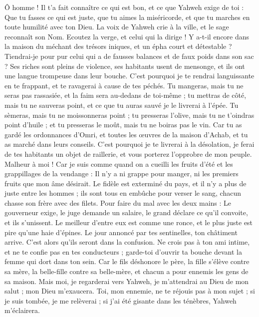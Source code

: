 \begin{multicols}{2}
Ô homme ! Il t'a fait connaître ce qui est bon, et ce que Yahweh exige de toi : Que tu fasses ce qui est juste, que tu aimes la miséricorde, et que tu marches en toute humilité avec ton Dieu.
La voix de Yahweh crie à la ville, et le sage reconnaît son Nom. Ecoutez la verge, et celui qui la dirige !
Y a-t-il encore dans la maison du méchant des trésors iniques, et un épha court et détestable ?
Tiendrai-je pour pur celui qui a de fausses balances et de faux poids dans son sac ?
Ses riches sont pleins de violence, ses habitants usent de mensonge, et ils ont une langue trompeuse dans leur bouche.
C'est pourquoi je te rendrai languissante en te frappant, et te ravagerai à cause de tes péchés.
Tu mangeras, mais tu ne seras pas rassasiée, et la faim sera au-dedans de toi-même ; tu mettras de côté, mais tu ne sauveras point, et ce que tu auras sauvé je le livrerai à l'épée.
Tu sèmeras, mais tu ne moissonneras point ; tu presseras l'olive, mais tu ne t'oindras point d'huile ; et tu presseras le moût, mais tu ne boiras pas le vin.
Car tu as gardé les ordonnances d'Omri, et toutes les œuvres de la maison d'Achab, et tu as marché dans leurs conseils. C'est pourquoi je te livrerai à la désolation, je ferai de tes habitants un objet de raillerie, et vous porterez l'opprobre de mon peuple.
\VerseOne{}Malheur à moi ! Car je suis comme quand on a cueilli les fruits d'été et les grappillages de la vendange : Il n'y a ni grappe pour manger, ni les premiers fruits que mon âme désirait.
Le fidèle est exterminé du pays, et il n'y a plus de juste entre les hommes ; ils sont tous en embûche pour verser le sang, chacun chasse son frère avec des filets.
Pour faire du mal avec les deux mains : Le gouverneur exige, le juge demande un salaire, le grand déclare ce qu'il convoite, et ils s'unissent.
Le meilleur d'entre eux est comme une ronce, et le plus juste est pire qu'une haie d'épines. Le jour annoncé par tes sentinelles, ton châtiment arrive. C'est alors qu'ils seront dans la confusion.
Ne crois pas à ton ami intime, et ne te confie pas en tes conducteurs ; garde-toi d'ouvrir ta bouche devant la femme qui dort dans ton sein.
Car le fils déshonore le père, la fille s'élève contre sa mère, la belle-fille contre sa belle-mère, et chacun a pour ennemis les gens de sa maison.
Mais moi, je regarderai vers Yahweh, je m'attendrai au Dieu de mon salut ; mon Dieu m'exaucera.
Toi, mon ennemie, ne te réjouis pas à mon sujet ; si je suis tombée, je me relèverai ; si j'ai été gisante dans les ténèbres, Yahweh m'éclairera.

\end{multicols}
